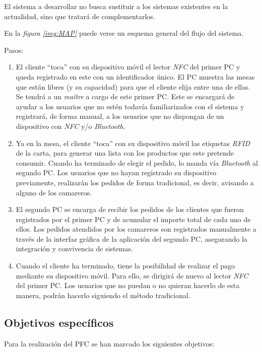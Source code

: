 El sistema a desarrollar no busca sustituir a los sistemas existentes en la
actualidad, sino que tratará de complementarlos.


En la \emph{figura \ref{img:MAP}} puede verse un esquema general del flujo del
sistema.


Pasos:
\begin{enumerate}
\item El cliente ``toca'' con su dispositivo móvil el lector \emph{NFC} del
  primer PC y queda registrado en este con un identificador único. El PC
  muestra las mesas que están libres (y su capacidad) para que el cliente elija
  entre una de ellas.
  Se tendrá a un \emph{maître} a cargo de este primer PC. Este se encargará de
  ayudar a los usuarios que no estén todavía familiarizados con el sistema y
  registrará, de forma manual, a los usuarios que no dispongan de un
  dispositivo con \emph{NFC} y/o \emph{Bluetooth}.
\item Ya en la mesa, el cliente ``toca'' con su dispositivo móvil las etiquetas
  \emph{RFID} de la carta, para generar una lista con los productos que este
  pretende consumir. Cuando ha terminado de elegir el pedido, lo manda vía
  \emph{Bluetooth} al segundo PC.
  Los usuarios que no hayan registrado su dispositivo previamente,
  realizarán los pedidos de forma tradicional, es decir, avisando a alguno de
  los camareros.
\item El segundo PC se encarga de recibir los pedidos de los clientes que
  fueron registrados por el primer PC y de acumular el importe total de cada
  uno de ellos.
  Los pedidos atendidos por los camareros son registrados manualmente a través
  de la interfaz gráfica de la aplicación del segundo PC, asegurando la 
  integración y convivencia de sistemas.
\item Cuando el cliente ha terminado, tiene la posibilidad de realizar el pago
  mediante su dispositivo móvil. Para ello, se dirigirá de nuevo al lector 
  \emph{NFC} del primer PC.
  Los usuarios que no puedan o no quieran hacerlo de esta manera, podrán
  hacerlo siguiendo el método tradicional.
\end{enumerate}

\subsection{Objetivos específicos}
Para la realización del PFC se han marcado los siguientes objetivos:
